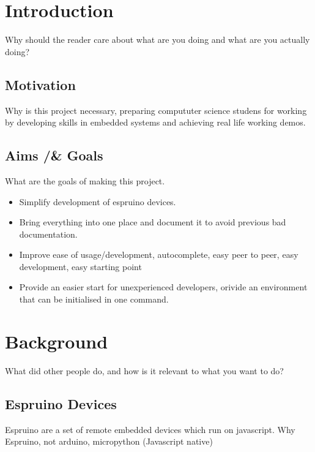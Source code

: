 \documentclass{l4proj}
\begin{document}
\chapter{Introduction}



Why should the reader care about what are you doing and what are you actually doing?
\section{Motivation}

\text Why is this project necessary, preparing compututer science studens for working by developing skills in embedded systems and achieving real life working demos.

\section{Aims /& Goals}

What are the goals of making this project.

\begin{itemize}
    \item
    Simplify development of espruino devices.
    \item
    Bring everything into one place and document it to avoid previous bad documentation.
    \item
    Improve ease of usage/development, autocomplete, easy peer to peer, easy development, easy starting point
    \item
    Provide an easier start for unexperienced developers, orivide an environment that can be initialised in one command.
\end{itemize}



\chapter{Background}
What did other people do, and how is it relevant to what you want to do?
\section{Espruino Devices}
\text    
    Espruino are a set of remote embedded devices which run on javascript. Why Espruino, not arduino, micropython (Javascript native)
    
\end{document}
